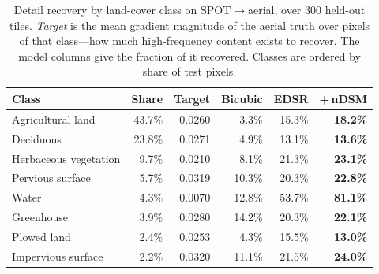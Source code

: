 \begin{table}[t]\centering\footnotesize
\caption{Detail recovery by land-cover class on SPOT$\rightarrow$aerial, over 300 held-out tiles. \emph{Target} is the mean gradient magnitude of the aerial truth over pixels of that class---how much high-frequency content exists to recover. The model columns give the fraction of it recovered. Classes are ordered by share of test pixels.}
\label{tab:perclass}
\setlength{\tabcolsep}{4pt}
\begin{tabular}{@{}lrrrrr@{}}\toprule
Class & Share & Target & Bicubic & EDSR & +\,nDSM\\\midrule
Agricultural land & 43.7\% & 0.0260 & 3.3\% & 15.3\% & \textbf{18.2\%}\\
Deciduous & 23.8\% & 0.0271 & 4.9\% & 13.1\% & \textbf{13.6\%}\\
Herbaceous vegetation & 9.7\% & 0.0210 & 8.1\% & 21.3\% & \textbf{23.1\%}\\
Pervious surface & 5.7\% & 0.0319 & 10.3\% & 20.3\% & \textbf{22.8\%}\\
Water & 4.3\% & 0.0070 & 12.8\% & 53.7\% & \textbf{81.1\%}\\
Greenhouse & 3.9\% & 0.0280 & 14.2\% & 20.3\% & \textbf{22.1\%}\\
Plowed land & 2.4\% & 0.0253 & 4.3\% & 15.5\% & \textbf{13.0\%}\\
Impervious surface & 2.2\% & 0.0320 & 11.1\% & 21.5\% & \textbf{24.0\%}\\
\bottomrule\end{tabular}\end{table}